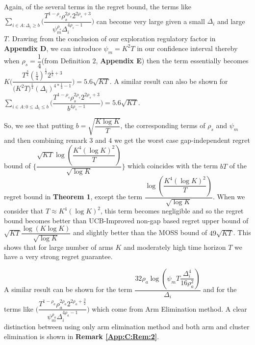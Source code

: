 \begin{remark}
\label{Result:Rem:4}
Again, of the several terms in the regret bound, the terms like  $\sum_{i\in A:\Delta_{i}\geq b}\bigg(\dfrac{T^{1-\rho_{s}}\rho_{s}^{2\rho_{s}}2^{2\rho_{s}+3}}{\psi_{m}^{\rho_{s}}\Delta_{i}^{4\rho_{s}-1}} \bigg)$ can become very large given a small $\Delta_{i}$ and large $T$. Drawing from the conclusion of our exploration regulatory factor in \textbf{Appendix D}, we can introduce $\psi_{m}=K^{2}T$ in our confidence interval thereby when $\rho_{s}=\dfrac{1}{4}$(from Definition $2$, \textbf{Appendix E}) then the term essentially becomes $K\bigg(\dfrac{T^{\frac{3}{4}}(\frac{1}{4})^{\frac{1}{2}}2^{\frac{1}{2}+3}}{{(K^{2}T})^{\frac{1}{4}}{(\Delta_{i})^{4*\frac{1}{4}-1}}} \bigg) = 5.6\sqrt{KT}$. A similar result can also be shown for $\sum_{i\in A:0\leq\Delta_{i}\leq b}\bigg(\dfrac{T^{1-\rho_{s}}\rho_{s}^{2\rho_{s}}2^{2\rho_{s}+3}}{b^{4\rho_{s} -1}} \bigg)=5.6\sqrt{KT}$. 
\end{remark}

\begin{remark}
\label{Result:Rem:5}
So, we see that putting $b=\sqrt{\dfrac{K\log K}{T}}$, the corresponding terms of $\rho_{s}$ and $\psi_{m}$ and then combining remark $3$ and $4$ we get the worst case gap-independent regret bound of $\bigg\lbrace \dfrac{\sqrt{KT}\log{(\dfrac{K^{4}(\log K)^{2}}{T})}}{\sqrt{\log K}}\bigg\rbrace$ which coincides with the term $bT$ of the regret bound in \textbf{Theorem 1}, except the term  $\dfrac{\log{(\dfrac{K^{4}(\log K)^{2}}{T})}}{\sqrt{\log K}}$. When we consider that $T\approx K^{4}(\log K)^{2}$, this term becomes negligible and so the regret bound becomes better than UCB-Improved non-gap based regret upper bound of $\sqrt{KT}\dfrac{\log(K\log K)}{\sqrt{\log K}}$ and slightly better than the MOSS bound of $49\sqrt{KT}$. This shows that for large number of arms $K$ and moderately high time horizon $T$ we have a very strong regret guarantee.
\end{remark}

\begin{remark}
\label{Result:Rem:6}
A similar result can be shown for the term $\dfrac{32\rho_{a}\log{(\psi_{m}T\dfrac{\Delta_{i}^{4}}{16\rho_{a}^{2}})}}{\Delta_{i}}$ and for the terms like $\bigg(\dfrac{T^{1-\rho_{a}}\rho_{a}^{2\rho_{a}}2^{2\rho_{a}+\frac{3}{2}}}{\psi_{m}^{\rho_{a}}\Delta_{i}^{4\rho_{a}-1}} \bigg)$ which come from Arm Elimination method. A clear distinction between using only arm elimination method and both arm and cluster elimination is shown in \textbf{Remark \ref{App:C:Rem:2}}.
\end{remark}

